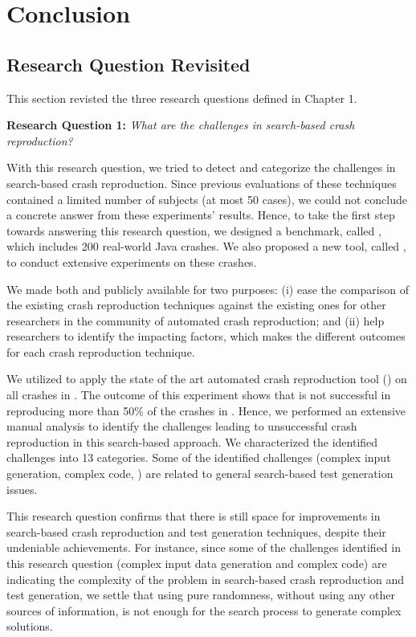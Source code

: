 \chapter{Conclusion}
\label{conclusion}

\section{Research Question Revisited}

This section revisted the three research questions defined in Chapter 1.


\textbf{Research Question 1: }\textit{What are the challenges in search-based crash reproduction?}

With this research question, we tried to detect and categorize the challenges in search-based crash reproduction. Since previous evaluations of these techniques contained a limited number of subjects (at most 50 cases), we could not conclude a concrete answer from these experiments' results. Hence, to take the first step towards answering this research question, we designed a benchmark, called \crashpack, which includes 200 real-world Java crashes. We also proposed a new tool, called \exrunner, to conduct extensive experiments on these crashes.

We made both \crashpack and \exrunner publicly available for two purposes: 
(i) ease the comparison of the existing crash reproduction techniques against the existing ones for other researchers in the community of automated crash reproduction; and 
(ii) help researchers to identify the impacting factors, which makes the different outcomes for each crash reproduction technique.

We utilized \exrunner to apply the state of the art automated crash reproduction tool (\evocrash) on all crashes in \jcrashpack. The outcome of this experiment shows that \evocrash is not successful in reproducing more than 50\% of the crashes in \jcrashpack. Hence, we performed an extensive manual analysis to identify the challenges leading to unsuccessful crash reproduction in this search-based approach. We characterized the identified challenges into 13 categories. Some of the identified challenges (\eg complex input generation, complex code, \etc) are related to general search-based test generation issues.

This research question confirms that there is still space for improvements in search-based crash reproduction and test generation techniques, despite their undeniable achievements. For instance, since some of the challenges identified in this research question (complex input data generation and complex code) are indicating the complexity of the problem in search-based crash reproduction and test generation, we settle that using pure randomness, without using any other sources of information, is not enough for the search process to generate complex solutions.



